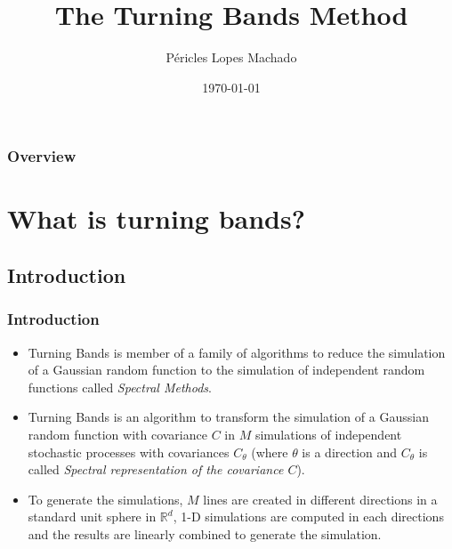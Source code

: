 \documentclass{beamer}
\title[Turning Bands]{The Turning Bands Method} %
\author{Péricles Lopes Machado} %
\institute[UFRGS] %
{
Universidade Federal do Rio Grande do Sul \\ %
\medskip
\textit{eu@gogo40.com} %
}
\date{\today} %
\begin{document}
\begin{frame}
\titlepage %
\end{frame}

\begin{frame}
\frametitle{Overview} %
\tableofcontents %
\end{frame}



\section{What is turning bands?} %
\subsection{Introduction} %

\begin{frame}
\frametitle{Introduction}
\begin{itemize}
\item Turning Bands is member of a family of algorithms to reduce the simulation of a Gaussian
random function to the simulation of independent random functions called \textit{Spectral Methods}.
\item Turning Bands is an algorithm to transform the simulation of a Gaussian random function
with covariance $C$ in $M$ simulations of independent stochastic processes with covariances
$C_\theta$ (where $\theta$ is a direction and $C_\theta$ is called \textit{Spectral representation of the covariance $C$}).
\item To generate the simulations, $M$ lines are created in different directions in a standard
unit sphere in $\mathbb{R}^d$, 1-D simulations are computed in each directions and the results are 
linearly combined to generate the simulation. 
\end{itemize}
\end{frame}
\end{document}
